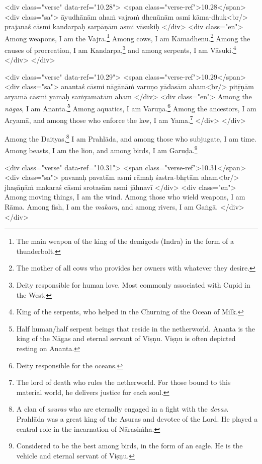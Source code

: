\begin{html}
<div class="verse" data-ref="10.28">
  <span class="verse-ref">10.28</span>
  <div class="sa">
    āyudhānām ahaṁ vajraṁ dhenūnām asmi kāma-dhuk<br/>
    prajanaś cāsmi kandarpaḥ sarpāṇām asmi vāsukiḥ
  </div>
  <div class="en">
    Among weapons, I am the Vajra.\footnote{The main weapon of the king of the demigods (Indra) in the form of a thunderbolt.} Among cows, I am Kāmadhenu.\footnote{The mother of all cows who provides her owners with whatever they desire.} Among the causes of procreation, I am Kandarpa,\footnote{Deity responsible for human love. Most commonly associated with Cupid in the West.} and among serpents, I am Vāsuki.\footnote{King of the serpents, who helped in the Churning of the Ocean of Milk.}
  </div>
</div>
\end{html}



\begin{html}
<div class="verse" data-ref="10.29">
  <span class="verse-ref">10.29</span>
  <div class="sa">
    anantaś cāsmi nāgānāṁ varuṇo yādasām aham<br/>
    pitṝṇām aryamā cāsmi yamaḥ saṁyamatām aham
  </div>
  <div class="en">
    Among the \textit{nāgas}, I am Ananta.\footnote{Half human/half serpent beings that reside in the netherworld. Ananta is the king of the Nāgas and eternal servant of Viṣṇu. Viṣṇu is often depicted resting on Ananta.} Among aquatics, I am Varuṇa.\footnote{Deity responsible for the oceans.} Among the ancestors, I am Aryamā, and among those who enforce the law, I am Yama.\footnote{The lord of death who rules the netherworld. For those bound to this material world, he delivers justice for each soul.}
  </div>
</div>
\end{html}


{Among the Daityas,\footnote{A clan of \textit{asuras} who are eternally engaged in a fight with the \textit{devas}. Prahlāda was a great king of the Asuras and devotee of the Lord. He played a central role in the incarnation of Nārasiṁha.} I am Prahlāda, and among those who subjugate, I am time. Among beasts, I am the lion, and among birds, I am Garuḍa.\footnote{Considered to be the best among birds, in the form of an eagle. He is the vehicle and eternal servant of Viṣṇu.}}


\begin{html}
<div class="verse" data-ref="10.31">
  <span class="verse-ref">10.31</span>
  <div class="sa">
    pavanaḥ pavatām asmi rāmaḥ śastra-bhṛtām aham<br/>
    jhaṣāṇāṁ makaraś cāsmi srotasām asmi jāhnavī
  </div>
  <div class="en">
    Among moving things, I am the wind. Among those who wield weapons, I am Rāma. Among fish, I am the \textit{makara}, and among rivers, I am Gaṅgā.
  </div>
</div>
\end{html}



